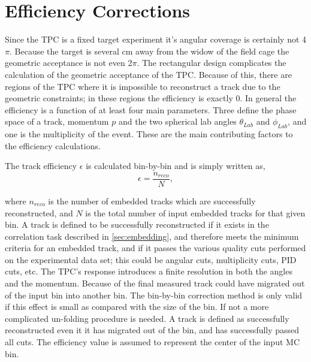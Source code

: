 



\section{Efficiency Corrections}
\label{sec:efficiency}

Since the \spirit TPC is a fixed target experiment it's angular coverage is certainly not 4$\pi$. Because the target is several cm away from the widow of the field cage the geometric acceptance is not even 2$\pi$. The rectangular design complicates the calculation of the geometric acceptance of the TPC. Because of this, there are regions of the TPC where it is impossible to reconstruct a track due to the geometric constraints; in these regions the efficiency is exactly 0. In general the efficiency is a function of at least four main parameters. Three define the phase space of a track, momentum $p$ and the two spherical lab angles $\theta_{Lab}$ and $\phi_{Lab}$, and one is the multiplicity of the event. These are the main contributing factors to the efficiency calculations. 

The track efficiency $\epsilon$ is calculated bin-by-bin and is simply written as, 
\begin{equation}
\epsilon = \frac{n_{reco}}{N},
\end{equation}

where $n_{reco}$ is the number of embedded tracks which are successfully reconstructed, and $N$ is the total number of input embedded tracks for that given bin. A track is defined to be successfully reconstructed if it exists in the correlation task described in \ref{sec:embedding}, and therefore meets the minimum criteria for an embedded track, and if it passes the various quality cuts performed on the experimental data set; this could be angular cuts, multiplicity cuts, PID cuts, etc. The TPC's response introduces a finite resolution in both the angles and the momentum. Because of the final measured track could have migrated out of the input bin into another bin. The bin-by-bin correction method is only valid if this effect is small as compared with the size of the bin. If not a more complicated un-folding procedure is needed. A track is defined as successfully reconstructed even it it has migrated out of the bin, and has successfully passed all cuts. The efficiency value is assumed to represent the center of the input MC bin.  

